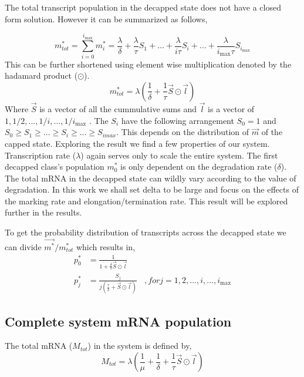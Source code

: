 \documentclass[review]{elsarticle}
\newcommand{\imax}{\ensuremath{i_{\max}}\xspace}
\begin{document}
The total transcript population in the decapped state does not have a closed form solution. However it can be summarized as follows,

\begin{equation}
	m_{tot}^{*} = \sum_{i=0}^{\imax} m_{i}^{*} = \frac{\lambda}{\delta} + \frac{\lambda}{\tau}S_{1} + \hdots + \frac{\lambda}{i \tau}S_{i} + \hdots  + \frac{\lambda}{\imax \tau}S_{\imax} 
\end{equation}
This can be further shortened using element wise multiplication denoted by the hadamard product ($\odot$).
\begin{equation}
	m_{tot}^{*} = \lambda(\frac{1}{\delta} + \frac{1}{\tau}\vec{S} \odot \vec{l}	) 
\end{equation}
Where $\vec{S}$ is a vector of all the cummulative sums and $\vec{l}$ is a vector of $1,1/2,...,1/i,...,1/\imax$ . The $S_{i}$ have the following arrangement $S_{0}=1$ and $ S_{0} \ge S_{1} \ge ... \ge S_{i} \ge ... \ge S_{imax}$. This depends on the distribution of $\vec{m}$ of the capped state. Exploring the result we find a few properties of our system. Transcription rate ($\lambda$) again serves only to scale the entire system. The first decapped class's population $m_{0}^{*}$ is only dependent on the degradation rate ($\delta$). The total mRNA in the decapped state can wildly vary according to the value of degradation. In this work we shall set delta to be large and focus on the effects of the marking rate and elongation/termination rate. This result will be explored further in the results.

To get the probability distribution of transcripts across the decapped state we can divide $\vec{m^{*}}/m_{tot}^{*}$ which results in,
\begin{align*}
	p_{0}^{*} &= \frac{1}{1 + \frac{\delta}{\tau}\vec{S} \odot \vec{l}}	\\
  	p_{j}^{*} &= \frac{S_{j}}{j(\frac{\tau}{\delta} + \vec{S} \odot \vec{l})}	\:\:\:\:, for j=1, 2, ..., i, ..., \imax
\end{align*}

\subsection{Complete system mRNA population}
The total mRNA ($M_{tot}$) in the system is defined by,
\begin{equation}
	M_{tot} = \lambda(\frac{1}{\mu} + \frac{1}{\delta} + \frac{1}{\tau}\vec{S} \odot \vec{l}	) 
\end{equation}
\end{document}
